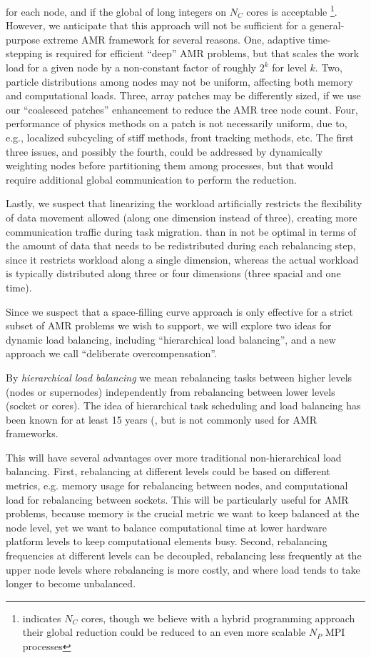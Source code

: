 \documentclass{article}
\begin{document}
for each node, and if the global  of long
integers on $N_C$ cores is acceptable \footnote{\cite{BuGh08}
  indicates $N_C$ cores, though we believe with a hybrid programming
  approach their global reduction could be reduced to an even more
  scalable $N_P$ MPI processes}.  However, we anticipate that this
approach will not be sufficient for a general-purpose extreme AMR
framework for several reasons.
%
One, adaptive time-stepping is required for efficient ``deep'' AMR
problems, but that scales the work load for a given node by a
non-constant factor of roughly $2^k$ for level $k$.
%
Two, particle distributions among nodes may not be uniform, affecting both memory and computational loads.
%
Three, array patches may be differently sized, if we use our ``coalesced patches'' enhancement to reduce the AMR tree node count.  
%
Four, performance of physics methods on a patch is not necessarily
uniform, due to, e.g., localized subcycling of stiff methods, front
tracking methods, etc.  The first three issues, and possibly the
fourth, could be addressed by dynamically weighting nodes before
partitioning them among processes, but that would require additional
global communication to perform the reduction.
%

Lastly, we suspect that linearizing the workload artificially
restricts the flexibility of data movement allowed (along one
dimension instead of three), creating more communication traffic
during task migration.  than in not be optimal in terms of the amount
of data that needs to be redistributed during each rebalancing step,
since it restricts workload along a single dimension, whereas the
actual workload is typically distributed along three or four
dimensions (three spacial and one time).

Since we suspect that a space-filling curve approach is only effective
for a strict subset of AMR problems we wish to support, we will
explore two ideas for dynamic load balancing, including ``hierarchical
load balancing'', and a new approach we call ``deliberate
overcompensation''.

%
By \textit{hierarchical load balancing} we mean rebalancing tasks
between higher levels (nodes or supernodes) independently from
rebalancing between lower levels (socket or cores).  The idea of
hierarchical task scheduling and load balancing has been known for at
least 15 years (\cite{AhGh94}, but is not commonly used for AMR
frameworks.

This will have several advantages over more traditional
non-hierarchical load balancing.  First, rebalancing at different
levels could be based on different metrics, e.g. memory usage for
rebalancing between nodes, and computational load for rebalancing
between sockets.  This will be particularly useful for AMR problems,
because memory is the crucial metric we want to keep balanced at the
node level, yet we want to balance computational time at lower
hardware platform levels to keep computational elements busy.  Second,
rebalancing frequencies at different levels can be decoupled,
rebalancing less frequently at the upper node levels where rebalancing
is more costly, and where load tends to take longer to become
unbalanced.
\end{document}

